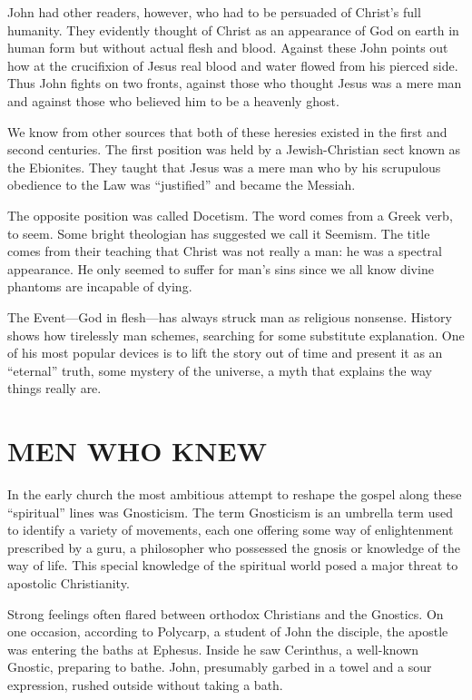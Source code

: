 John had other readers, however, who had to be persuaded of Christ’s full humanity. They evidently
thought of Christ as an appearance of God on earth in human form but without actual flesh and blood.
Against these John points out how at the crucifixion of Jesus real blood and water flowed from his
pierced side. Thus John fights on two fronts, against those who thought Jesus was a mere man and
against those who believed him to be a heavenly ghost.

We know from other sources that both of these heresies existed in the first and second centuries.
The first position was held by a Jewish-Christian sect known as the Ebionites. They taught that
Jesus was a mere man who by his scrupulous obedience to the Law was “justified” and became the
Messiah.

The opposite position was called Docetism. The word comes from a Greek verb, to seem. Some bright
theologian has suggested we call it Seemism. The title comes from their teaching that Christ was not
really a man: he was a spectral appearance. He only seemed to suffer for man’s sins since we all
know divine phantoms are incapable of dying.

The Event—God in flesh—has always struck man as religious nonsense. History shows how tirelessly man
schemes, searching for some substitute explanation. One of his most popular devices is to lift the
story out of time and present it as an “eternal” truth, some mystery of the universe, a myth that
explains the way things really are.

\section{MEN WHO KNEW}

In the early church the most ambitious attempt to reshape the gospel along these “spiritual” lines
was Gnosticism. The term Gnosticism is an umbrella term used to identify a variety of movements,
each one offering some way of enlightenment prescribed by a guru, a philosopher who possessed the
gnosis or knowledge of the way of life. This special knowledge of the spiritual world posed a major
threat to apostolic Christianity.

Strong feelings often flared between orthodox Christians and the Gnostics. On one occasion,
according to Polycarp, a student of John the disciple, the apostle was entering the baths at
Ephesus. Inside he saw Cerinthus, a well-known Gnostic, preparing to bathe. John, presumably garbed
in a towel and a sour expression, rushed outside without taking a bath.

